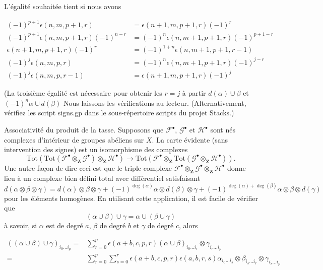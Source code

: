 L'égalité souhaitée tient si nous avons

\begin{align*}
(-1)^{p + 1} \epsilon(n, m, p + 1, r)
& =
\epsilon(n + 1, m, p + 1, r) (-1)^r \\
(-1)^{p + 1} \epsilon(n, m, p + 1, r) (-1)^{n - r}
& =
(-1)^n \epsilon(n, m + 1, p + 1, r) (-1)^{p + 1 - r} \\
\epsilon(n + 1, m, p + 1, r) (-1)^r
& =
(-1)^{1 + n} \epsilon(n, m + 1, p + 1, r - 1) \\
(-1)^j \epsilon(n, m, p, r)
& =
(-1)^n \epsilon(n, m + 1, p + 1, r) (-1)^{j - r} \\
(-1)^j \epsilon(n, m, p, r - 1)
& =
\epsilon(n + 1, m, p + 1, r) (-1)^j
\end{align*}

(La troisième égalité est nécessaire pour obtenir les $r = j$
à partir $d(\alpha) \cup \beta$ et $(-1)^n \alpha \cup d(\beta)$
Nous laissons les vérifications au lecteur. (Alternativement, vérifiez les script signs.gp dans le sous-répertoire scripts du projet Stacks.)

\medskip\noindent

Associativité du produit de la tasse. Supposons que ${\mathcal F}^\bullet$,
${\mathcal G}^\bullet$ et ${\mathcal H}^\bullet$ sont nés complexes d'intérieur de groupes abéliens sur $X$. La carte évidente (sans intervention des signes) est un isomorphisme des complexes
$$
\text{Tot}(
\text{Tot}({\mathcal F}^\bullet \otimes_{\mathbf Z} {\mathcal G}^\bullet)
\otimes_{\mathbf Z} {\mathcal H}^\bullet
)
\longrightarrow
\text{Tot}(
{\mathcal F}^\bullet \otimes_{\mathbf Z}
\text{Tot}({\mathcal G}^\bullet \otimes_{\mathbf Z} {\mathcal H}^\bullet)
).
$$
Une autre façon de dire ceci est que le triple complexe
${\mathcal F}^\bullet \otimes_{\mathbf Z} {\mathcal G}^\bullet
\otimes_{\mathbf Z} {\mathcal H}^\bullet$ donne lieu à un complexe bien défini total avec différentiel satisfaisant
$$
d(\alpha \otimes \beta \otimes \gamma) =
d(\alpha) \otimes \beta \otimes \gamma +
(-1)^{\deg(\alpha)} \alpha \otimes d(\beta) \otimes \gamma +
(-1)^{\deg(\alpha) + \deg(\beta)} \alpha \otimes \beta \otimes d(\gamma)
$$
pour les éléments homogènes. En utilisant cette application, il est facile de vérifier que
$$
(\alpha \cup \beta) \cup \gamma = \alpha \cup ( \beta \cup \gamma)
$$
à savoir, si $\alpha$ est de degré $a$, $\beta$ de degré $b$ et
$\gamma$ de degré $c$, alors

\begin{align*}
((\alpha \cup \beta) \cup \gamma)_{i_0 \ldots i_p}
= &
\sum\nolimits_{r = 0}^p
\epsilon(a + b, c, p, r)
(\alpha \cup \beta)_{i_0 \ldots i_r} \otimes \gamma_{i_r \ldots i_p}
\\
= &
\sum\nolimits_{r = 0}^p
\sum\nolimits_{s = 0}^r
\epsilon(a + b, c, p, r) \epsilon(a, b, r, s)
\alpha_{i_0 \ldots i_s} \otimes
\beta_{i_s \ldots i_r} \otimes
\gamma_{i_r \ldots i_p}
\end{align*}

